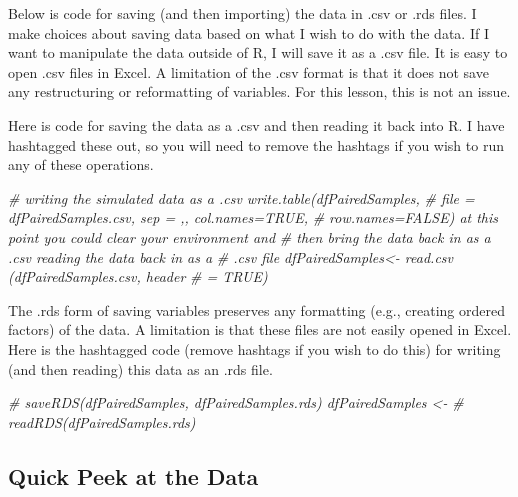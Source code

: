 \documentclass[
  11pt,
]{book}
\newenvironment{Shaded}{\begin{snugshade}}{\end{snugshade}}
\newcommand{\CommentTok}[1]{\textcolor[rgb]{0.37,0.37,0.37}{\textit{#1}}}
\begin{document}
Below is code for saving (and then importing) the data in .csv or .rds files. I make choices about saving data based on what I wish to do with the data. If I want to manipulate the data outside of R, I will save it as a .csv file. It is easy to open .csv files in Excel. A limitation of the .csv format is that it does not save any restructuring or reformatting of variables. For this lesson, this is not an issue.

Here is code for saving the data as a .csv and then reading it back into R. I have hashtagged these out, so you will need to remove the hashtags if you wish to run any of these operations.

\begin{Shaded}
\begin{Highlighting}[]
\CommentTok{\# writing the simulated data as a .csv write.table(dfPairedSamples,}
\CommentTok{\# file = \textquotesingle{}dfPairedSamples.csv\textquotesingle{}, sep = \textquotesingle{},\textquotesingle{}, col.names=TRUE,}
\CommentTok{\# row.names=FALSE) at this point you could clear your environment and}
\CommentTok{\# then bring the data back in as a .csv reading the data back in as a}
\CommentTok{\# .csv file dfPairedSamples\textless{}{-} read.csv (\textquotesingle{}dfPairedSamples.csv\textquotesingle{}, header}
\CommentTok{\# = TRUE)}
\end{Highlighting}
\end{Shaded}

The .rds form of saving variables preserves any formatting (e.g., creating ordered factors) of the data. A limitation is that these files are not easily opened in Excel. Here is the hashtagged code (remove hashtags if you wish to do this) for writing (and then reading) this data as an .rds file.

\begin{Shaded}
\begin{Highlighting}[]
\CommentTok{\# saveRDS(dfPairedSamples, \textquotesingle{}dfPairedSamples.rds\textquotesingle{}) dfPairedSamples \textless{}{-}}
\CommentTok{\# readRDS(\textquotesingle{}dfPairedSamples.rds\textquotesingle{})}
\end{Highlighting}
\end{Shaded}

\hypertarget{quick-peek-at-the-data-2}{%
\subsection{Quick Peek at the Data}\label{quick-peek-at-the-data-2}}
\end{document}

